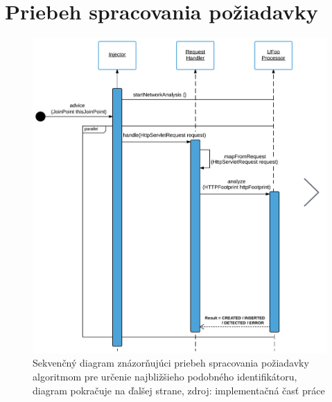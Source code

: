 \documentclass[
  digital, %
  oneside, %
  table,   %
  lof,     %
  nolot,   %
  nocover
]{fithesis3}
\begin{document}
\chapter{Priebeh spracovania požiadavky}
\label{fig:appendix-impl-flow}
\begin{figure}[H]
  \centering
    \includegraphics[width=1\textwidth]{images/footprint-impl-flow-1.png}
  \caption{Sekvenčný diagram znázorňujúci priebeh spracovania požiadavky algoritmom
  pre určenie najbližšieho podobného identifikátoru, diagram pokračuje na ďalšej strane,
  zdroj: implementačná časť práce}
\end{figure}
\end{document}

